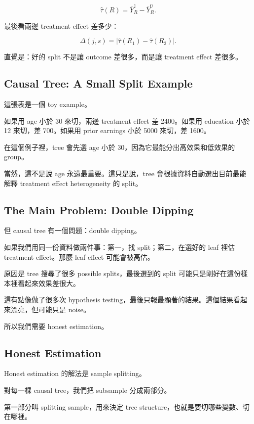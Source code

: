 \documentclass[
  chinese,
  11pt,
]{article}
\begin{document}
\[
\hat{\tau}(R)=\bar{Y}^{1}_{R}-\bar{Y}^{0}_{R}.
\]

最後看兩邊 treatment effect 差多少：

\[
\Delta(j,s)=
\left|\hat{\tau}(R_1)-\hat{\tau}(R_2)\right|.
\]

直覺是：好的 split 不是讓 outcome 差很多，而是讓 treatment effect
差很多。

\subsection{Causal Tree: A Small Split
Example}\label{causal-tree-a-small-split-example}

這張表是一個 toy example。

如果用 age 小於 30 來切，兩邊 treatment effect 差 2400。如果用 education
小於 12 來切，差 700。如果用 prior earnings 小於 5000 來切，差 1600。

在這個例子裡，tree 會先選 age 小於 30，因為它最能分出高效果和低效果的
group。

當然，這不是說 age 永遠最重要。這只是說，tree
會根據資料自動選出目前最能解釋 treatment effect heterogeneity 的 split。

\subsection{The Main Problem: Double
Dipping}\label{the-main-problem-double-dipping}

但 causal tree 有一個問題：double dipping。

如果我們用同一份資料做兩件事：第一，找 split；第二，在選好的 leaf 裡估
treatment effect。那麼 leaf effect 可能會被高估。

原因是 tree 搜尋了很多 possible splits，最後選到的 split
可能只是剛好在這份樣本裡看起來效果差很大。

這有點像做了很多次 hypothesis
testing，最後只報最顯著的結果。這個結果看起來漂亮，但可能只是 noise。

所以我們需要 honest estimation。

\subsection{Honest Estimation}\label{honest-estimation}

Honest estimation 的解法是 sample splitting。

對每一棵 causal tree，我們把 subsample 分成兩部分。

第一部分叫 splitting sample，用來決定 tree
structure，也就是要切哪些變數、切在哪裡。
\end{document}
